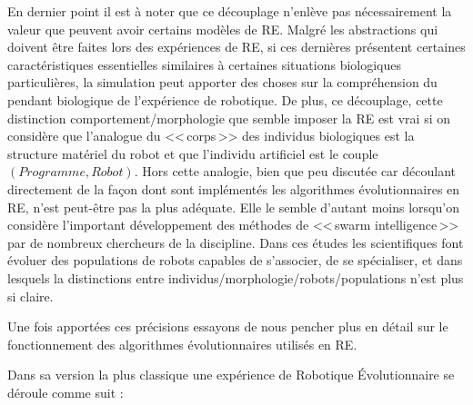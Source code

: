 En dernier point il est à noter que ce découplage n'enlève pas nécessairement la valeur que peuvent avoir certains modèles de RE. Malgré les abstractions qui doivent être faites lors des expériences de RE, si ces dernières présentent certaines caractéristiques essentielles similaires à certaines situations biologiques particulières, la simulation peut apporter des choses sur la compréhension du pendant biologique de l'expérience de robotique. De plus, ce découplage, cette distinction comportement/morphologie que semble imposer la RE est vrai si on considère que l'analogue du <<\,corps\,>> des individus biologiques est la structure matériel du robot et que l'individu artificiel est le couple $(Programme,Robot)$. Hors cette analogie, bien que peu discutée car découlant directement de la façon dont sont implémentés les algorithmes évolutionnaires en RE, n'est peut-être pas la plus adéquate. Elle le semble d'autant moins lorsqu'on considère l'important développement des méthodes de <<\,swarm intelligence\,>> par de nombreux chercheurs de la discipline. Dans ces études les scientifiques font évoluer des populations de robots capables de s'associer, de se spécialiser, et dans lesquels la distinctions entre individus/morphologie/robots/populations n'est plus si claire.

Une fois apportées ces précisions essayons de nous pencher plus en détail sur le fonctionnement des algorithmes évolutionnaires utilisés en RE.

Dans sa version la plus classique une expérience de Robotique Évolutionnaire se déroule comme suit \citep[pour certains exemples historiques de la littératures]{nolfi96learning,floreano94automaticcreationofanautonomousagen,jakobi97evolutionaryroboticsandtheradicalenvelopeofnoisehypothesis}:

